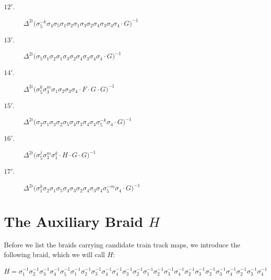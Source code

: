 \begin{description}
    \item[$12'.$] $\displaystyle \Delta^{2i} \big( \allowbreak\sigma_{5}^{-k}\allowbreak\sigma_{4}\allowbreak\sigma_{5}\allowbreak\sigma_{1}\allowbreak\sigma_{2}\allowbreak\sigma_{1}\allowbreak\sigma_{3}\allowbreak\sigma_{2}\allowbreak\sigma_{4}\allowbreak\sigma_{3}\allowbreak\sigma_{4}\allowbreak\sigma_{4} \cdot G \big)^{-1}$
    \item[$13'.$] $\displaystyle \Delta^{2i} \big( \allowbreak\sigma_{5}\allowbreak\sigma_{1}\allowbreak\sigma_{2}\allowbreak\sigma_{1}\allowbreak\sigma_{3}\allowbreak\sigma_{2}\allowbreak\sigma_{4}\allowbreak\sigma_{3}\allowbreak\sigma_{4}\allowbreak\sigma_{4} \cdot G \big)^{-1}$
    \item[$14'.$] $\displaystyle \Delta^{2i} \big( \allowbreak\sigma_{5}^{k}\allowbreak\sigma_{3}^{m}\allowbreak\sigma_{1}\allowbreak\sigma_{2}\allowbreak\sigma_{3}\allowbreak\sigma_{4} \cdot F \cdot G \cdot G \big)^{-1}$
    \item[$15'.$] $\displaystyle \Delta^{2i} \big( \allowbreak\sigma_{2}\allowbreak\sigma_{1}\allowbreak\sigma_{3}\allowbreak\sigma_{2}\allowbreak\sigma_{5}\allowbreak\sigma_{4}\allowbreak\sigma_{3}\allowbreak\sigma_{4}\allowbreak\sigma_{4}\allowbreak\sigma_{5}^{-k}\allowbreak\sigma_{4} \cdot G \big)^{-1}$
    \item[$16'.$] $\displaystyle \Delta^{2i} \big( \allowbreak\sigma_{5}^{j}\allowbreak\sigma_{3}^{m}\allowbreak\sigma_{1}^{k} \cdot H \cdot G \cdot G \big)^{-1}$
    \item[$17'.$] $\displaystyle \Delta^{2i} \big( \allowbreak\sigma_{1}^{k}\allowbreak\sigma_{2}\allowbreak\sigma_{1}\allowbreak\sigma_{5}\allowbreak\sigma_{4}\allowbreak\sigma_{3}\allowbreak\sigma_{2}\allowbreak\sigma_{4}\allowbreak\sigma_{3}\allowbreak\sigma_{4}\allowbreak\sigma_{5}^{-m}\allowbreak\sigma_{4} \cdot G \big)^{-1}$
\end{description}
\endgroup

\clearpage

\section{The Auxiliary Braid \texorpdfstring{$H$}{H}}
Before we list the braids carrying candidate train track maps, we introduce the following braid, which we will call $H$:

\begin{flushleft}
$\displaystyle H = \allowbreak\sigma_{1}^{-1}\allowbreak\sigma_{2}^{-1}\allowbreak\sigma_{3}^{-1}\allowbreak\sigma_{4}^{-1}\allowbreak\sigma_{5}^{-1}\allowbreak\sigma_{1}^{-1}\allowbreak\sigma_{2}^{-1}\allowbreak\sigma_{3}^{-1}\allowbreak\sigma_{4}^{-1}\allowbreak\sigma_{4}^{-1}\allowbreak\sigma_{3}^{-1}\allowbreak\sigma_{2}^{-1}\allowbreak\sigma_{1}^{-1}\allowbreak\sigma_{2}^{-1}\allowbreak\sigma_{3}^{-1}\allowbreak\sigma_{4}^{-1}\allowbreak\sigma_{2}^{-1}\allowbreak\sigma_{3}^{-1}\allowbreak\sigma_{2}^{-1}\allowbreak\sigma_{3}^{-1}\allowbreak\sigma_{4}^{-1}\allowbreak\sigma_{2}^{-1}\allowbreak\sigma_{3}^{-1}\allowbreak\sigma_{4}^{-1}$
\end{flushleft}

